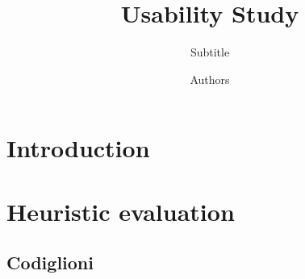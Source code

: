 \documentclass[a4paper, 11pt, parskip=half]{scrreprt}
\title{Usability Study}
\subtitle{Subtitle}
\author{Authors}
\begin{document}
\maketitle
\tableofcontents
\newpage
{}


\chapter{Introduction}


\chapter{Heuristic evaluation}

\section{Codiglioni}
\end{document}
